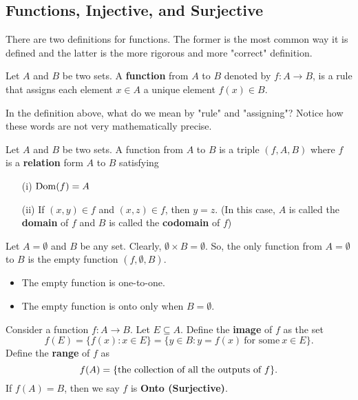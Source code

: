 \documentclass[a4paper]{report}
\begin{document}
\subsection{Functions, Injective, and Surjective}

There are two definitions for functions. The former is the most common way it is defined and the latter is the more rigorous and more "correct" definition. 

\begin{definition}
   Let \( A  \) and \( B  \) be two sets. A \textbf{function} from \( A  \) to \( B  \) denoted by \( f: A \to B  \), is a rule that assigns each element \( x \in A  \) a unique element \( f(x) \in B  \).  
\end{definition}

In the definition above, what do we mean by "rule" and "assigning"? Notice how these words are not very mathematically precise. 

\begin{definition}
    Let \( A  \) and \( B  \) be two sets. A function from \( A  \) to \( B  \) is a triple \( (f,A,B) \) where \( f \) is a \textbf{relation} form \( A  \) to \( B  \) satisfying 
    \begin{enumerate}
        \item[(i)] \( \operatorname{Dom}(f) = A   \) 
        \item[(ii)] If \( (x,y) \in f  \) and \( (x,z) \in f  \), then \( y = z  \). (In this case, \( A  \) is called the \textbf{domain} of \( f  \) and \( B  \) is called the \textbf{codomain} of \( f  \))
    \end{enumerate}
\end{definition}

\begin{eg}
    Let \( A = \emptyset  \) and \( B  \) be any set. Clearly, \( \emptyset \times B = \emptyset \). So, the only function from \( A = \emptyset  \) to \( B  \) is the empty function \( (f, \emptyset, B) \).
\end{eg}

\begin{itemize}
    \item The empty function is one-to-one.
    \item The empty function is onto only when \( B = \emptyset  \).
\end{itemize}


\begin{definition}
   Consider a function \( f: A \to B  \). Let \( E \subseteq A  \). Define the \textbf{image} of \( f  \) as the set    
   \[  f(E) = \{ f(x) : x \in  E \}  = \{ y \in B : y = f(x) \ \text{for some} \ x \in E  \}. \]
   Define the \textbf{range} of \( f  \) as 
   \[  f(A) = \{ \text{the collection of all the outputs of \( f \)} \}. \]
   If \( f(A) = B  \), then we say \( f \) is \textbf{Onto (Surjective)}.
\end{definition}
\end{document}
